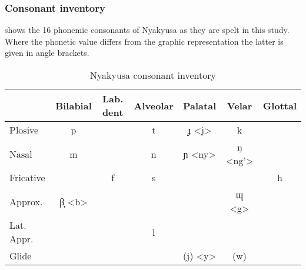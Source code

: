 \subsubsection{Consonant inventory}
 shows the 16 phonemic consonants of Nyakyusa as they are spelt in this study. Where the phonetic value differs from the graphic representation the latter is given in angle brackets.
\begin{table}[H] %
	
	
	\begin{tabular}{|l|c|c|c|c|c|c|}
		\hline & 
		\footnotesize{Bilabial}&
		\footnotesize{Lab. dent}&
		\footnotesize{Alveolar}&
		\footnotesize{Palatal}&
		\footnotesize{Velar}&
		\footnotesize{Glottal}\\	
		\hline Plosive &  				%
		p  &							%
		&							%
		t  &							%
		ɟ <j> &					%
		k &							%
		\\							%
		\hline Nasal & 					%
		m &							%
		&							%
		n &							%
		ɲ <ny> &						%
		ŋ <ng'> &  					%
		\\							%
		\hline Fricative & 				%
		& 							%
		f &							%
		s &							%
		&							%
		&							%
		h \\						%
		\hline Approx. &				%
		β̞ <b>   &     			%
		&						%
		&						%
		&						%
		ɰ <g> &				%
		\\						%
		\hline Lat. Appr. & 			%
		&						%
		&						%
		l &			%
		& 						%
		&						%
		\\						%
		\hline Glide & 				%
		&						%
		&						%
		&						%
		(j) <y>  &				%
		(w) &					%
		\\						%
		\hline
	\end{tabular}	
	\caption{Nyakyusa consonant inventory}
\label{TableConsonantInventory}	
\end{table}

